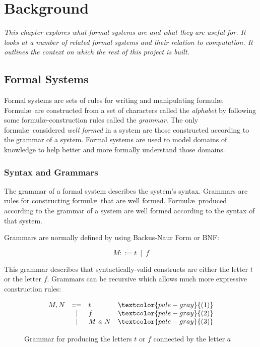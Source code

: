 
\chapter{Background}\label{chapter:background}

\textit{
This chapter explores what \emph{formal systems} are and what they are useful for. 
It looks at a number of related formal systems and their relation to computation. 
It outlines the context on which the rest of this project is built.
}


\section{Formal Systems}

Formal systems are sets of rules for writing and manipulating
formul\ae. Formul\ae\ are constructed from a set of characters called the
\emph{alphabet} by following some formul\ae-construction rules called
the \emph{grammar}. The only formul\ae\ considered \emph{well formed} in
a system are those constructed according to the grammar of a system.
Formal systems are used to model domains of knowledge to help better
and more formally understand those domains.

\subsection{Syntax and Grammars}

The grammar of a formal system describes the system's syntax. Grammars are 
rules for constructing formul\ae\ that are well formed. Formul\ae\
produced according to the grammar of a system are well formed according to 
the syntax of that system.

Grammars are normally defined by using Backus-Naur Form or BNF:

\[
  M ::= t\ \mid\ f
\]

This grammar describes that syntactically-valid constructs are either the letter $t$ or the letter $f$. 
Grammars can be recursive which allows much more expressive construction rules:

\begin{figure}[!h]\label{fig:tf-grammar}
\[
  \begin{array}{lclr}
    M,N&::=&t&\textcolor{pale-gray}{(1)} \\
      &|&f&\textcolor{pale-gray}{(2)} \\
      &|&M\ a\ N&\textcolor{pale-gray}{(3)} \\
  \end{array}
\]
\caption{Grammar for producing the letters $t$ or $f$ connected by the letter $a$}
\end{figure}

